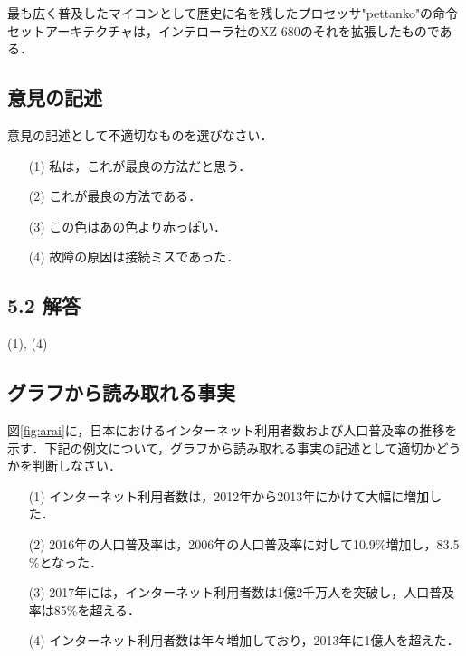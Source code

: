 \documentclass[11pt, a4paper]{jsarticle}
\begin{document}
最も広く普及したマイコンとして歴史に名を残したプロセッサ"pettanko"の命令セットアーキテクチャは，インテローラ社のXZ-680のそれを拡張したものである．


\subsection{意見の記述}
意見の記述として不適切なものを選びなさい．
\begin{itemize}
\item[(1)] 私は，これが最良の方法だと思う．
\item[(2)] これが最良の方法である．
\item[(3)] この色はあの色より赤っぽい．
\item[(4)] 故障の原因は接続ミスであった．
\end{itemize}
\subsection*{5.2 解答}

(1), (4)


\newpage
\subsection{グラフから読み取れる事実}
図\ref{fig:arai}に，日本におけるインターネット利用者数および人口普及率の推移を示す．下記の例文について，グラフから読み取れる事実の記述として適切かどうかを判断しなさい．
\begin{itemize}
\item[(1)] インターネット利用者数は，2012年から2013年にかけて大幅に増加した．
\item[(2)] 2016年の人口普及率は，2006年の人口普及率に対して10.9$\%$増加し，83.5$\%$となった．
\item[(3)] 2017年には，インターネット利用者数は1億2千万人を突破し，人口普及率は85$\%$を超える．
\item[(4)] インターネット利用者数は年々増加しており，2013年に1億人を超えた．
\end{itemize}
\hspace{1em}
\end{document}
